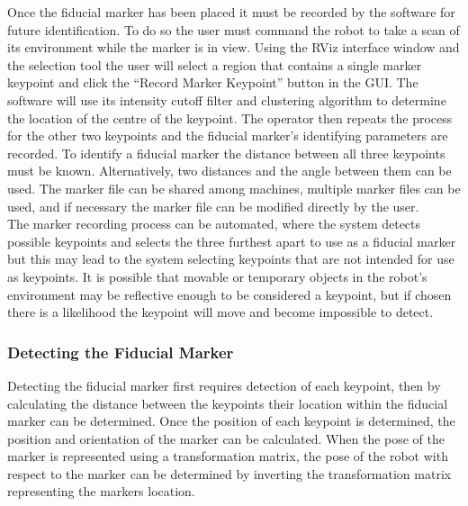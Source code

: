 Once the fiducial marker has been placed it must be recorded by the software for future identification. To do so the user must command the robot to take a scan of its environment while the marker is in view. Using the RViz interface window and the selection tool the user will select a region that contains a single marker keypoint and click the ``Record Marker Keypoint'' button in the GUI. The software will use its intensity cutoff filter and clustering algorithm to determine the location of the centre of the keypoint. The operator then repeats the process for the other two keypoints and the fiducial marker's identifying parameters are recorded. To identify a fiducial marker the distance between all three keypoints must be known. Alternatively, two distances and the angle between them can be used. The marker file can be shared among machines, multiple marker files can be used, and if necessary the marker file can be modified directly by the user.\\

The marker recording process can be automated, where the system detects possible keypoints and selects the three furthest apart to use as a fiducial marker but this may lead to the system selecting keypoints that are not intended for use as keypoints. It is possible that movable or temporary objects in the robot's environment may be reflective enough to be considered a keypoint, but if chosen there is a likelihood the keypoint will move and become impossible to detect.\\

\subsubsection{Detecting the Fiducial Marker}

Detecting the fiducial marker first requires detection of each keypoint, then by calculating the distance between the keypoints their location within the fiducial marker can be determined. Once the position of each keypoint is determined, the position and orientation of the marker can be calculated. When the pose of the marker is represented using a transformation matrix, the pose of the robot with respect to the marker can be determined by inverting the transformation matrix representing the markers location.\\

